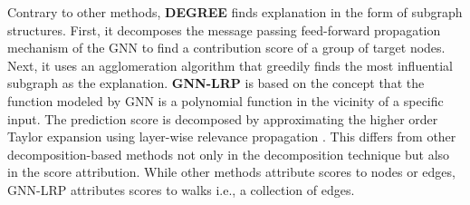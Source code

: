 Contrary to other methods, \textbf{DEGREE} \cite{degree} finds explanation in the form of subgraph structures. First, it decomposes the message passing feed-forward propagation mechanism of the GNN to find a contribution score of a group of target nodes. Next, it uses an agglomeration algorithm that greedily finds the most influential subgraph as the explanation. \textbf{GNN-LRP} \cite{GNN-LRP} is based on the concept that the function modeled by GNN is a polynomial function in the vicinity of a specific input. The prediction score is decomposed by approximating the higher order Taylor expansion using layer-wise relevance propagation \cite{LRP-main}. This differs from other decomposition-based methods not only in the decomposition technique but also in the score attribution. While other methods attribute scores to nodes or edges, GNN-LRP attributes scores to walks i.e., a collection of edges. 




